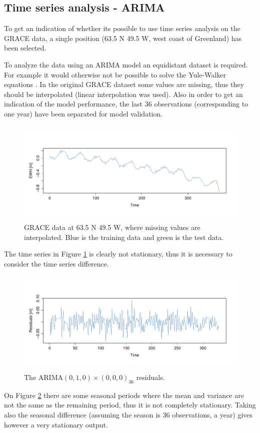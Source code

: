 
\subsection{Time series analysis - ARIMA}

To get an indication of whether its possible to use time series analysis on the GRACE data, a single position (63.5 N 49.5 W, west coast of Greenland) has been selected.

To analyze the data using an ARIMA model an equidistant dataset is required. For example it would otherwise not be possible to solve the Yule-Walker equations \cite[s.~122]{time-series-analysis}. In the original GRACE dataset some values are missing, thus they should be interpolated (linear interpolation was used). Also in order to get an indication of the model performance, the last 36 observations (corresponding to one year) have been separated for model validation.

\begin{figure}[H]
\centering
\includegraphics[height=5cm]{figures/ts-initial-split}
\caption{GRACE data at 63.5 N 49.5 W, where missing values are interpolated. Blue is the training data and green is the  test data.}
\label{fig:ts-initial-split}
\end{figure}

The time series in Figure \ref{fig:ts-initial-split} is clearly not stationary, thus it is necessary to consider the time series difference.
\begin{figure}[H]
	\centering
	\includegraphics[height=5cm]{figures/ts-residual-i1s0}
	\caption{The ARIMA$(0,1,0) \times (0,0,0)_{36}$ residuals.}
	\label{fig:ts-residual-i1s0}
\end{figure}
On Figure \ref{fig:ts-residual-i1s0} there are some seasonal periods where the mean and variance are not the same as the remaining period, thus it is not completely stationary. Taking also the seasonal difference (assuming the season is 36 observations, a year) gives however a very stationary output.

